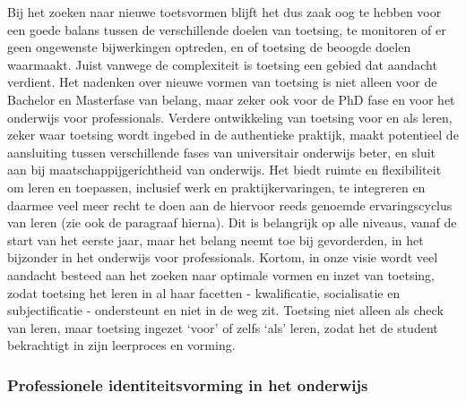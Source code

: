 \documentclass[smallauthor, chapterhaspagenum, nochapterinheader, pagenuminheader,  bigchapnum,medium2, tocpages, garamond, titleinheader]{jote-book}
\begin{document}
	Bij het zoeken naar nieuwe toetsvormen blijft het dus zaak oog te hebben voor een goede balans tussen de verschillende doelen van toetsing, te monitoren of er geen ongewenste bijwerkingen optreden, en of toetsing de beoogde doelen waarmaakt. Juist vanwege de complexiteit is toetsing een gebied dat aandacht verdient. Het nadenken over nieuwe vormen van toetsing is niet alleen voor de Bachelor en Masterfase van belang, maar zeker ook voor de PhD fase en voor het onderwijs voor professionals. Verdere ontwikkeling van toetsing voor en als leren, zeker waar toetsing wordt ingebed in de authentieke praktijk, maakt potentieel de aansluiting tussen verschillende fases van universitair onderwijs beter, en sluit aan bij maatschappijgerichtheid van onderwijs. Het biedt ruimte en flexibiliteit om leren en toepassen, inclusief werk en praktijkervaringen, te integreren en daarmee veel meer recht te doen aan de hiervoor reeds genoemde ervaringscyclus van leren (zie ook de paragraaf hierna). Dit is belangrijk op alle niveaus, vanaf de start van het eerste jaar, maar het belang neemt toe bij gevorderden, in het bijzonder in het onderwijs voor professionals. Kortom, in onze visie wordt veel aandacht besteed aan het zoeken naar optimale vormen en inzet van toetsing, zodat toetsing het leren in al haar facetten - kwalificatie, socialisatie en subjectificatie - ondersteunt en niet in de weg zit. Toetsing niet alleen als check van leren, maar toetsing ingezet ‘voor' of zelfs ‘als' leren, zodat het de student bekrachtigt in zijn leerproces en vorming.



	\subsubsection{Professionele identiteitsvorming in het onderwijs}
\end{document}
